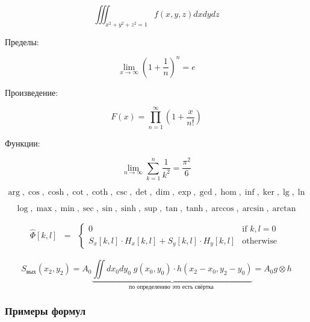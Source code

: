 \documentclass[
  a4paper,
]{book}
\theoremstyle{definition}
\theoremstyle{definition}
\theoremstyle{definition}
\theoremstyle{definition}
\theoremstyle{remark}
\begin{document}
\begin{equation}
\iiint_{x^2 + y^2 + z^2 = 1} f(x, y, z) dx dy dz
\end{equation}

Пределы:

\begin{equation}
\lim\limits_{x \to \infty} \left(1 + \frac{1}{n} \right)^n = e
\end{equation}

Произведение:

\begin{equation}
F(x)= \prod_{n=1}^{\infty}\left(1 + \frac{x}{n!} \right)
\end{equation}

Функции:

\begin{equation}
    \lim_{n \to \infty}
    \sum_{k=1}^n \frac{1}{k^2}
    = \frac{\pi^2}{6}
\end{equation}

\begin{equation}
\arg, \cos, \cosh, \cot, \coth, \csc,\det, \dim, \exp, \gcd, \hom, \inf, \ker, \lg, \ln
\end{equation}

\begin{equation}
\log, \max, \min, \sec, \sin, \sinh, \sup,\tan, \tanh, \arccos, \arcsin, \arctan
\end{equation}

\begin{equation}
    \begin{matrix}
    \hat{\Phi}[k,l] & =
    & \left\{
    \begin{matrix}
    0 & \mbox{if } k,l = 0 \\
    S_x[k,l]\cdot H_x[k,l] + S_y[k,l]\cdot H_y[k,l] & \mbox{otherwise }
    \end{matrix} \right.
    \end{matrix}
\end{equation}

\begin{equation}
S_{\text{вых}}(x_2, y_2) = A_0 \underbrace{\iint dx_0 dy_0 \; g(x_0, y_0) \cdot h(x_2-x_0, y_2 -y_0)}_{\text{по определению это есть свёртка }} = A_0 g \otimes h
\end{equation}

\hypertarget{markdown-syntax-math-examples}{%
\subsubsection{Примеры формул}\label{markdown-syntax-math-examples}}
\end{document}
